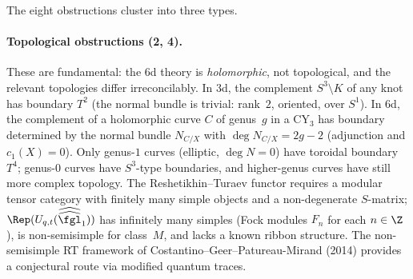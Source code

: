 \medskip
\noindent The eight obstructions cluster into three types.

\paragraph{Topological obstructions (2, 4).}
These are fundamental: the 6d theory is \emph{holomorphic}, not topological, and the relevant topologies differ irreconcilably. In 3d, the complement $S^3 \setminus K$ of any knot has boundary $T^2$ (the normal bundle is trivial: rank~$2$, oriented, over $S^1$). In 6d, the complement of a holomorphic curve $C$ of genus~$g$ in a CY$_3$ has boundary determined by the normal bundle $N_{C/X}$ with $\deg N_{C/X} = 2g - 2$ (adjunction and $c_1(X) = 0$). Only genus-$1$ curves (elliptic, $\deg N = 0$) have toroidal boundary $T^4$; genus-$0$ curves have $S^3$-type boundaries, and higher-genus curves have still more complex topology. The Reshetikhin--Turaev functor requires a modular tensor category with finitely many simple objects and a non-degenerate $S$-matrix; $\Rep(U_{q,t}(\widehat{\widehat{\fgl}}_1))$ has infinitely many simples (Fock modules $F_n$ for each $n \in \Z$), is non-semisimple for class~$M$, and lacks a known ribbon structure. The non-semisimple RT framework of Costantino--Geer--Patureau-Mirand (2014) provides a conjectural route via modified quantum traces.

